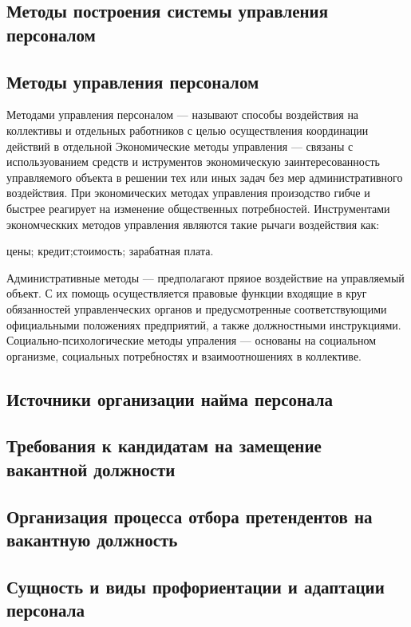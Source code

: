 \documentclass[a4paper,12pt,oneside,final]{extarticle}
\numberwithin{equation}{section}
\begin{document}
\subsection{Методы построения системы управления персоналом}

\subsection{Методы управления персоналом}
Методами управления персоналом --- называют способы воздействия на коллективы и отдельных работников с целью осуществления координации действий в отдельной 
Экономические методы управления --- связаны с используованием средств и иструментов экономическую заинтересованность управляемого объекта в решении тех или иных задач без мер административного воздействия. 
При экономических методах управления произодство гибче и быстрее реагирует на изменение общественных потребностей. 
Инструментами экономческких методов управления являются такие рычаги воздействия как: 
\begin{itemize}
	цены;
	кредит;стоимость;
	зарабатная плата.
\end{itemize}
Административные методы --- предполагают пряиое воздействие на управляемый объект. 
С их помощь осуществляется правовые функции входящие в круг обязанностей управленческих органов и предусмотренные соответствующими официальными положениях предприятий, а также должностными инструкциями.
Социально-психологические методы упраления --- основаны на социальном организме, социальных потребностях и взаимоотношениях в коллективе. 

\subsection{Источники организации найма персонала}

\subsection{Требования к кандидатам на замещение вакантной должности}

\subsection{Организация процесса отбора претендентов на вакантную должность}

\subsection{Сущность и виды профориентации и адаптации персонала}
\end{document}
